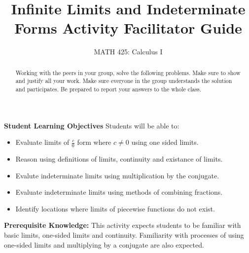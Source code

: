 \documentclass{ximera}
\title{Infinite Limits and Indeterminate Forms Activity Facilitator Guide}
\author{MATH 425: Calculus I}
\begin{document}
\begin{abstract}
    Working with the peers in your group, solve the following problems. Make sure to show and justify all your work. Make sure everyone in the group understands the solution and participates. Be prepared to report your answers to the whole class. 
\end{abstract}
\maketitle

\textbf{Student Learning Objectives}
Students will be able to:
\begin{itemize}
    \item Evaluate limits of $\frac{c}{0}$ form where $c\neq0$ using one sided limits.
    \item Reason using definitions of limits, continuity and existance of limits.
    \item Evalute indeterminate limits using multiplication by the conjugate.
    \item Evaluate indeterminate limits using methods of combining fractions.
    \item Identify locations where limits of piecewise functions do not exist.
\end{itemize}
\textbf{Prerequisite Knowledge:} This activity expects students to be familiar with basic limits, one-sided limits and continuity. Familiarity with processes of using one-sided limits and multiplying by a conjugate are also expected.  
\end{document}
